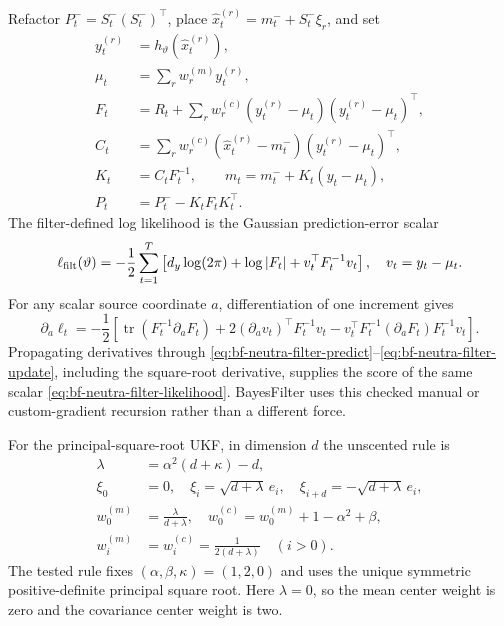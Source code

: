 Refactor $P_t^-=S_t^-(S_t^-)^\top$, place
$\widehat x_t^{(r)}=m_t^-+S_t^-\xi_r$, and set
\begin{align}
 y_t^{(r)}&=h_\vartheta(\widehat x_t^{(r)}),\\
 \mu_t&=\sum_rw_r^{(m)}y_t^{(r)},\\
 F_t&=R_t+\sum_rw_r^{(c)}(y_t^{(r)}-\mu_t)(y_t^{(r)}-\mu_t)^\top,\\
 C_t&=\sum_rw_r^{(c)}(\widehat x_t^{(r)}-m_t^-)
       (y_t^{(r)}-\mu_t)^\top,\\
 K_t&=C_tF_t^{-1},\qquad m_t=m_t^-+K_t(y_t-\mu_t),\\
 P_t&=P_t^--K_tF_tK_t^\top.
 \label{eq:bf-neutra-filter-update}
\end{align}
The filter-defined log likelihood is the Gaussian prediction-error scalar
\begin{equation}
 \ell_{\rm filt}(\vartheta)=-\frac12\sum_{t=1}^T\left[
 d_y\log(2\pi)+\log|F_t|+v_t^\top F_t^{-1}v_t\right],
 \quad v_t=y_t-\mu_t.
 \label{eq:bf-neutra-filter-likelihood}
\end{equation}
For any scalar source coordinate $a$, differentiation of one increment gives
\begin{equation}
 \partial_a\ell_t=-\frac12\left[
 \operatorname{tr}(F_t^{-1}\partial_aF_t)
 +2(\partial_av_t)^\top F_t^{-1}v_t
 -v_t^\top F_t^{-1}(\partial_aF_t)F_t^{-1}v_t\right].
 \label{eq:bf-neutra-filter-score}
\end{equation}
Propagating derivatives through
\eqref{eq:bf-neutra-filter-predict}--\eqref{eq:bf-neutra-filter-update}, including
the square-root derivative, supplies the score of the same scalar
\eqref{eq:bf-neutra-filter-likelihood}.  BayesFilter uses this checked manual
or custom-gradient recursion rather than a different force.

For the principal-square-root UKF, in dimension $d$ the unscented rule is
\begin{align}
 \lambda&=\alpha^2(d+\kappa)-d,\\
 \xi_0&=0,\quad \xi_i=\sqrt{d+\lambda}\,e_i,\quad
 \xi_{i+d}=-\sqrt{d+\lambda}\,e_i,\\
 w_0^{(m)}&=\frac{\lambda}{d+\lambda},\quad
 w_0^{(c)}=w_0^{(m)}+1-\alpha^2+\beta,\\
 w_i^{(m)}&=w_i^{(c)}=\frac1{2(d+\lambda)}\quad(i>0).
 \label{eq:bf-neutra-ukf-rule}
\end{align}
The tested rule fixes $(\alpha,\beta,\kappa)=(1,2,0)$ and uses the unique
symmetric positive-definite principal square root.  Here $\lambda=0$, so the
mean center weight is zero and the covariance center weight is two.

